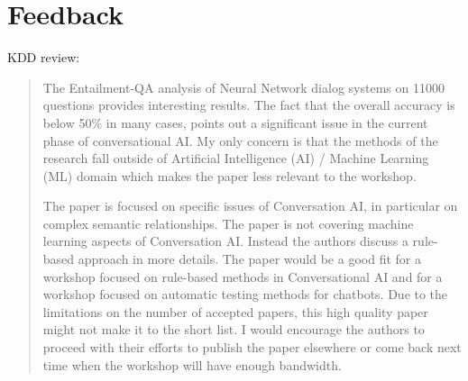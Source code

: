 \section{Feedback}


KDD review:

\begin{quote}
The Entailment-QA analysis of Neural Network dialog systems on 11000 questions provides interesting results. The fact that the overall accuracy is below 50$\%$ in many cases, points out a significant issue in the current phase of conversational AI. My only concern is that the methods of the research fall outside of Artificial Intelligence (AI) / Machine Learning (ML) domain which makes the paper less relevant to the workshop.

The paper is focused on specific issues of Conversation AI, in particular on complex semantic relationships. The paper is not covering machine learning aspects of Conversation AI. Instead the authors discuss a rule-based approach in more details. The paper would be a good fit for a workshop focused on rule-based methods in Conversational AI and for a workshop focused on automatic testing methods for chatbots. Due to the limitations on the number of accepted papers, this high quality paper might not make it to the short list. I would encourage the authors to proceed with their efforts to publish the paper elsewhere or come back next time when the workshop will have enough bandwidth.
\end{quote}
